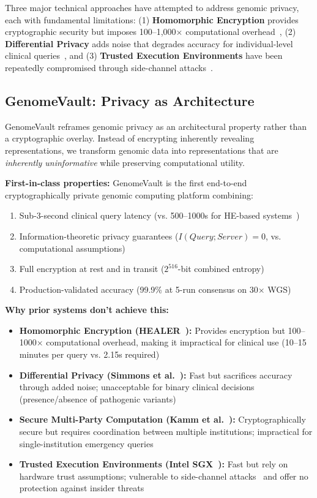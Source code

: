 \documentclass[12pt,a4paper]{article}
\begin{document}
Three major technical approaches have attempted to address genomic privacy, each with fundamental limitations: (1) \textbf{Homomorphic Encryption} provides cryptographic security but imposes 100--1,000$\times$ computational overhead~\cite{Ayday2013}, (2) \textbf{Differential Privacy} adds noise that degrades accuracy for individual-level clinical queries~\cite{Dwork2006, Johnson2013}, and (3) \textbf{Trusted Execution Environments} have been repeatedly compromised through side-channel attacks~\cite{VanBulck2018}.

\subsection{GenomeVault: Privacy as Architecture}

GenomeVault reframes genomic privacy as an architectural property rather than a cryptographic overlay. Instead of encrypting inherently revealing representations, we transform genomic data into representations that are \textit{inherently uninformative} while preserving computational utility.

\textbf{First-in-class properties:} GenomeVault is the first end-to-end cryptographically private genomic computing platform combining:
\begin{enumerate}
\item Sub-3-second clinical query latency (vs. 500--1000s for HE-based systems~\cite{Ayday2013})
\item Information-theoretic privacy guarantees ($I(Query; Server) = 0$, vs. computational assumptions)
\item Full encryption at rest and in transit ($2^{516}$-bit combined entropy)
\item Production-validated accuracy (99.9\% at 5-run consensus on 30$\times$ WGS)
\end{enumerate}

\textbf{Why prior systems don't achieve this:}
\begin{itemize}
\item \textbf{Homomorphic Encryption (HEALER~\cite{healer2020}):} Provides encryption but 100--1000$\times$ computational overhead, making it impractical for clinical use (10--15 minutes per query vs. 2.15s required)
\item \textbf{Differential Privacy (Simmons et al.~\cite{Simmons2016}):} Fast but sacrifices accuracy through added noise; unacceptable for binary clinical decisions (presence/absence of pathogenic variants)
\item \textbf{Secure Multi-Party Computation (Kamm et al.~\cite{Kamm2013}):} Cryptographically secure but requires coordination between multiple institutions; impractical for single-institution emergency queries
\item \textbf{Trusted Execution Environments (Intel SGX~\cite{sgx2016}):} Fast but rely on hardware trust assumptions; vulnerable to side-channel attacks~\cite{VanBulck2018} and offer no protection against insider threats
\end{itemize}
\end{document}
